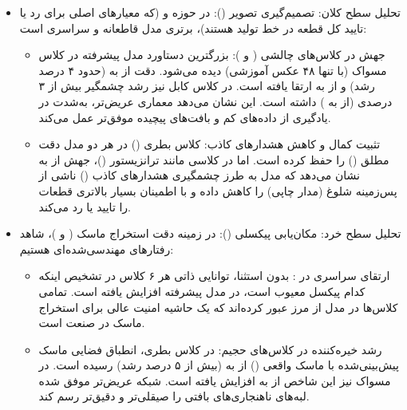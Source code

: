 \documentclass{article}
\begin{document}
\begin{itemize}
	\item تحلیل سطح کلان: تصمیم‌گیری تصویر ():
	در حوزه  و  (که معیارهای اصلی برای رد یا تایید کل قطعه در خط تولید هستند)، برتری مدل  قاطعانه و سراسری است:
	\begin{itemize}
		\item جهش در کلاس‌های چالشی ( و ): بزرگترین دستاورد مدل پیشرفته در کلاس مسواک (با تنها ۴۸ عکس آموزشی) دیده می‌شود. دقت  از  به  (حدود ۴ درصد رشد) و  از  به  ارتقا یافته است. در کلاس کابل نیز  رشد چشمگیر بیش از ۳ درصدی (از  به ) داشته است. این نشان می‌دهد معماری عریض‌تر، به‌شدت در یادگیری از داده‌های کم و بافت‌های پیچیده موفق‌تر عمل می‌کند.
		
		\item تثبیت کمال و کاهش هشدارهای کاذب: کلاس بطری () در هر دو مدل دقت مطلق () را حفظ کرده است. اما در کلاسی مانند ترانزیستور ()، جهش  از  به  نشان می‌دهد که مدل  به طرز چشمگیری هشدارهای کاذب () ناشی از پس‌زمینه شلوغ (مدار چاپی) را کاهش داده و با اطمینان بسیار بالاتری قطعات را تایید یا رد می‌کند.
	\end{itemize}
	
	\item تحلیل سطح خرد: مکان‌یابی پیکسلی ():
	در زمینه دقت استخراج ماسک ( و )، شاهد رفتارهای مهندسی‌شده‌ای هستیم:
	\begin{itemize}
		\item ارتقای سراسری در : بدون استثنا، توانایی ذاتی هر ۶ کلاس در تشخیص اینکه کدام پیکسل معیوب است، در مدل پیشرفته افزایش یافته است. تمامی کلاس‌ها در مدل  از مرز  عبور کرده‌اند که یک حاشیه امنیت عالی برای استخراج ماسک در صنعت است.
		
		\item رشد خیره‌کننده  در کلاس‌های حجیم: در کلاس بطری، انطباق فضایی ماسک پیش‌بینی‌شده با ماسک واقعی () از  به  (بیش از ۵ درصد رشد) رسیده است. در مسواک نیز این شاخص از  به  افزایش یافته است. شبکه عریض‌تر موفق شده لبه‌های ناهنجاری‌های بافتی را صیقلی‌تر و دقیق‌تر رسم کند.
		

\end{itemize}
\end{itemize}
\end{document}

